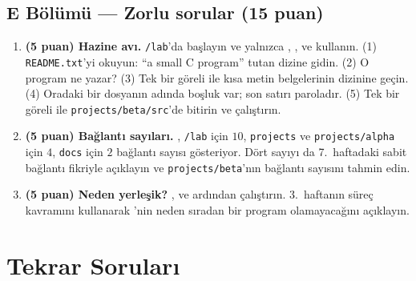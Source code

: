 \subsection*{E Bölümü --- Zorlu sorular (15 puan)}
\begin{enumerate}[label=\textbf{E\arabic*}, leftmargin=2.2em, start=16]
  \item \textbf{(5 puan) Hazine avı.} \texttt{\tl/lab}'da başlayın ve yalnızca , ,  ve  kullanın. (1) \texttt{README.txt}'yi okuyun: ``a small C program'' tutan dizine gidin. (2) O program ne yazar? (3) Tek bir göreli  ile kısa metin belgelerinin dizinine geçin. (4) Oradaki bir dosyanın adında boşluk var; son satırı paroladır. (5) Tek bir göreli  ile \texttt{projects/beta/src}'de bitirin ve  çalıştırın.
  \item \textbf{(5 puan) Bağlantı sayıları.} , \texttt{\tl/lab} için $10$, \texttt{projects} ve \texttt{projects/alpha} için $4$, \texttt{docs} için $2$ bağlantı sayısı gösteriyor. Dört sayıyı da 7.\ haftadaki sabit bağlantı fikriyle açıklayın ve \texttt{projects/beta}'nın bağlantı sayısını tahmin edin.
  \item \textbf{(5 puan) Neden yerleşik?} ,  ve ardından  çalıştırın. 3.\ haftanın süreç kavramını kullanarak 'nin neden sıradan bir program olamayacağını açıklayın.
\end{enumerate}

\section{Tekrar Soruları}

